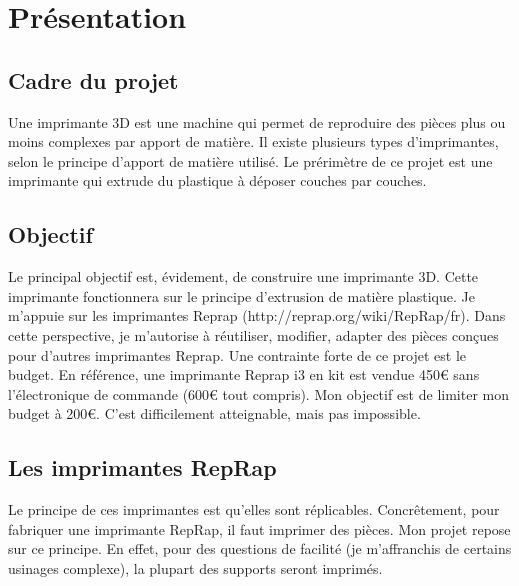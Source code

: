 \section{Présentation}
\subsection{Cadre du projet}
Une imprimante 3D est une machine qui permet de reproduire des pièces %
plus ou moins complexes par apport de matière. Il existe plusieurs types %
d'imprimantes, selon le principe d'apport de matière utilisé. Le prérimètre %
de ce projet est une imprimante qui extrude du plastique à déposer couches %
par couches.
%
\subsection{Objectif}
Le principal objectif est, évidement, de construire une imprimante 3D. Cette %
imprimante fonctionnera sur le principe d'extrusion de matière plastique. Je %
m'appuie sur les imprimantes Reprap (http://reprap.org/wiki/RepRap/fr). Dans %
cette perspective, je m'autorise à réutiliser, modifier, adapter des pièces %
conçues pour d'autres imprimantes Reprap.%
%
Une contrainte forte de ce projet est le budget. En référence, une imprimante %
Reprap i3 en kit est vendue 450\euro{} sans l'électronique de commande (600\euro{} tout %
compris). Mon objectif est de limiter mon budget à 200\euro{}. C'est difficilement %
atteignable, mais pas impossible.
%
\subsection{Les imprimantes RepRap}
Le principe de ces imprimantes est qu'elles sont réplicables. Concrêtement, %
pour fabriquer une imprimante RepRap, il faut imprimer des pièces. Mon projet %
repose sur ce principe. En effet, pour des questions de facilité (je m'affranchis %
de certains usinages complexe), la plupart des supports seront imprimés.